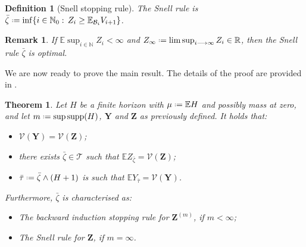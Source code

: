 \documentclass[11pt, a4paper, twoside]{article}
\newcommand*{\defeq}{\mathrel{\vcenter{\baselineskip0.5ex \lineskiplimit0pt
			\hbox{\scriptsize.}\hbox{\scriptsize.}}}=}
\newcommand{\ssup}[1]{{\scriptscriptstyle{({#1})}}}
\newcommand{\NN}{\mathbb{N}}
\newcommand{\RR}{\mathbb{R}}
\newcommand{\EE}{\mathbb{E}}
\newcommand{\TT}{\mathcal{T}}
\newcommand{\Val}{\mathcal{V}}
\newcommand{\YY}{\mathbf{Y}}
\newcommand{\DZ}{\mathbf{Z}}
\newcommand{\DF}{\mathcal{B}}
\newtheorem{theorem}{Theorem}[section]
\newtheorem{remark}{Remark}[section]
\newtheorem{definition}{Definition}[section]
\numberwithin{equation}{section}
\begin{document}
	\begin{definition}[Snell stopping rule]\label{snellstoprule}
		The \emph{Snell rule} is $\bar{\zeta}\defeq\inf\{i\in\NN_0:\,Z_i\ge \EE_{\DF_i}V_{i+1}\}$.
	\end{definition}
	\begin{remark}\label{snellstop}
		If $\EE \sup_{i\in\NN} Z_i<\infty$ and $Z_\infty\defeq \limsup_{i\longrightarrow\infty} Z_i\in\RR$, then the \emph{Snell rule} $\bar{\zeta}$ is optimal.
	\end{remark}
	We are now ready to prove the main result. The details of the proof are provided in .
	\begin{theorem}\label{optalg}
		Let $H$ be a finite horizon with $\mu\defeq\EE H$ and possibly mass at zero, and let $m\defeq\sup \supp(H)$, $\YY$ and $\DZ$ as previously defined. It holds that:
		\begin{itemize}[noitemsep]
			\item$\Val(\YY) = \Val(\DZ)$; 
			\item there exists $\bar{\zeta}\in\TT$ such that $\EE Z_{\bar{\zeta}} = \Val (\DZ)$;
			\item $\bar{\tau}\defeq \bar{\zeta}\wedge (H+1)$ is such that $\EE Y_{\bar{\tau}} = \Val(\YY)$.
		\end{itemize}
		Furthermore, $\bar{\zeta}$ is characterised as:
		\begin{itemize}[noitemsep]
			\item The \emph{backward induction stopping rule} for $\DZ^\ssup{m}$, if $m<\infty$;
			\item The \emph{Snell rule} for $\DZ$, if $m=\infty$.
		\end{itemize}
	\end{theorem}
\end{document}
